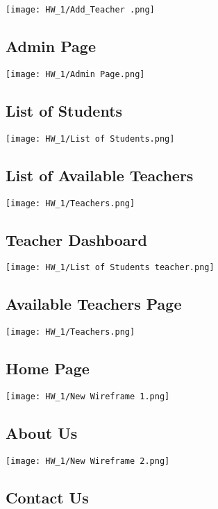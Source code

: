 \texttt{[image: HW\_1/Add\_Teacher .png]}

\subsection{Admin Page}

\texttt{[image: HW\_1/Admin Page.png]}

\subsection{List of Students}

\texttt{[image: HW\_1/List of Students.png]}

\subsection{List of Available Teachers}

\texttt{[image: HW\_1/Teachers.png]}

\subsection{Teacher Dashboard}

\texttt{[image: HW\_1/List of Students teacher.png]}

\subsection{Available Teachers Page}

\texttt{[image: HW\_1/Teachers.png]}

\subsection{Home Page}

\texttt{[image: HW\_1/New Wireframe 1.png]}

\subsection{About Us}

\texttt{[image: HW\_1/New Wireframe 2.png]}

\subsection{Contact Us}

